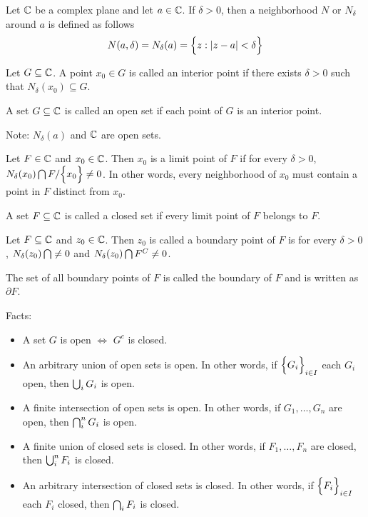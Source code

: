 \documentclass[12pt]{article}
\begin{document}
\begin{definition} Let $\mathbb{C}$ be a complex plane and let $a \in \mathbb{C}$. If $\delta > 0$, then a neighborhood $N$ or $N_\delta$ around $a$ is defined as follows 
$$ N(a,\delta) = N_\delta(a) = \Big\{  z: \abs{z-a} < \delta \Big\} $$ \end{definition} 
\begin{definition} Let $G \subseteq \mathbb{C}$. A point $x_0 \in G$ is called an interior point if there exists $\delta > 0$ such that $N_\delta(x_0) \subseteq G$. \end{definition} 
\begin{definition} A set $G \subseteq \mathbb{C}$ is called an open set if each point of $G$ is an interior point. \end{definition} 
Note: $N_\delta(a)$ and $\mathbb{C}$ are open sets. 
\begin{definition} Let $F \in \mathbb{C}$ and $x_0 \in \mathbb{C}$. Then $x_0$ is a limit point of $F$ if for every $\delta > 0$, $N_\delta(x_0) \bigcap F/\Big\{ x_0 \Big\} \neq 0$. In other words, every neighborhood of $x_0$ must contain a point in $F$ distinct from $x_0$. \end{definition} 
\begin{definition} A set $F \subseteq \mathbb{C}$ is called a closed set if every limit point of $F$ belongs to $F$. \end{definition} 
\begin{definition} Let $F \subseteq \mathbb{C}$ and $z_0 \in \mathbb{C}$. Then $z_0$ is called a boundary point of $F$ is for every $\delta > 0$, $N_\delta(z_0) \bigcap \neq 0$ and $N_\delta(z_0) \bigcap F^C \neq 0$. \end{definition} 
\begin{definition} The set of all boundary points of $F$ is called the boundary of $F$ and is written as $\partial F$. \end{definition} 
Facts: \begin{itemize} 
\item A set $G$ is open $\iff$ $G^c$ is closed. 
\item An arbitrary union of open sets is open. In other words, if $\Big\{ G_i \Big\}_{i \in I}$ each $G_i$ open, then $\bigcup_i G_i$ is open. 
\item A finite intersection of open sets is open. In other words, if $G_1,\dots,G_n$ are open, then $\bigcap_i^n G_i$ is open. 
\item A finite union of closed sets is closed. In other words, if $F_1,\dots,F_n$ are closed, then $\bigcup_i^n F_i$ is closed. 
\item An arbitrary intersection of closed sets is closed. In other words, if $\Big\{ F_i \Big\}_{i \in I}$ each $F_i$ closed, then $\bigcap_i F_i$ is closed. \end{itemize} 
\end{document}

